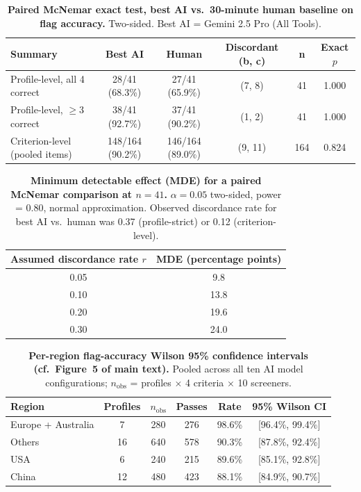 \documentclass[utf8]{frontiers_suppmat}
\begin{document}
\begin{table}[H]
\centering
\caption{\textbf{Paired McNemar exact test, best AI vs.\ 30-minute human baseline on flag accuracy.} Two-sided. Best AI = Gemini 2.5 Pro (All Tools).}
\label{tab:mcnemar}
\small
\begin{tabular}{lccccc}
\toprule
\textbf{Summary} & \textbf{Best AI} & \textbf{Human} & \textbf{Discordant (b, c)} & \textbf{n} & \textbf{Exact $p$} \\
\midrule
Profile-level, all 4 correct   & 28/41 (68.3\%)  & 27/41 (65.9\%)  & (7, 8)   &  41 & 1.000 \\
Profile-level, $\geq$3 correct & 38/41 (92.7\%)  & 37/41 (90.2\%)  & (1, 2)   &  41 & 1.000 \\
Criterion-level (pooled items) & 148/164 (90.2\%)& 146/164 (89.0\%)& (9, 11)  & 164 & 0.824 \\
\bottomrule
\end{tabular}
\end{table}

\begin{table}[H]
\centering
\caption{\textbf{Minimum detectable effect (MDE) for a paired McNemar comparison at $n = 41$.} $\alpha = 0.05$ two-sided, power = 0.80, normal approximation. Observed discordance rate for best AI vs.\ human was 0.37 (profile-strict) or 0.12 (criterion-level).}
\label{tab:mde}
\small
\begin{tabular}{cc}
\toprule
\textbf{Assumed discordance rate $r$} & \textbf{MDE (percentage points)} \\
\midrule
0.05 &  9.8 \\
0.10 & 13.8 \\
0.20 & 19.6 \\
0.30 & 24.0 \\
\bottomrule
\end{tabular}
\end{table}

\begin{table}[H]
\centering
\caption{\textbf{Per-region flag-accuracy Wilson 95\% confidence intervals (cf.\ Figure~5 of main text).} Pooled across all ten AI model configurations; $n_\text{obs}$ = profiles $\times$ 4 criteria $\times$ 10 screeners.}
\label{tab:region}
\small
\begin{tabular}{lccccc}
\toprule
\textbf{Region} & \textbf{Profiles} & \textbf{$n_\text{obs}$} & \textbf{Passes} & \textbf{Rate} & \textbf{95\% Wilson CI} \\
\midrule
Europe + Australia &  7 & 280 & 276 & 98.6\% & [96.4\%, 99.4\%] \\
Others             & 16 & 640 & 578 & 90.3\% & [87.8\%, 92.4\%] \\
USA                &  6 & 240 & 215 & 89.6\% & [85.1\%, 92.8\%] \\
China              & 12 & 480 & 423 & 88.1\% & [84.9\%, 90.7\%] \\
\bottomrule
\end{tabular}
\end{table}
\end{document}
